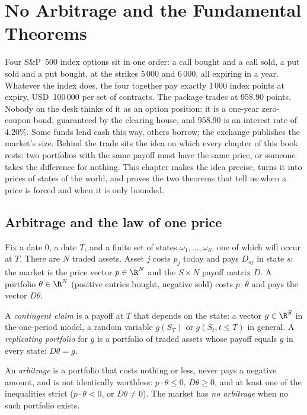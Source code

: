 \chapter{No Arbitrage and the Fundamental Theorems}\label{ch:dv:no-arbitrage-and-the-fundamental-theorems}

Four S\&P~500 index options sit in one order: a call bought and a call sold,
a put sold and a put bought, at the strikes 5\,000 and 6\,000, all expiring in
a year. Whatever the index does, the four together pay exactly 1\,000 index
points at expiry, USD~100\,000 per set of contracts. The package trades at
958.90 points. Nobody on the desk thinks of it as an option position: it is a
one-year zero-coupon bond, guaranteed by the clearing house, and 958.90 is an
interest rate of 4.20\%. Some funds lend cash this way, others borrow; the
exchange publishes the market's size. Behind the trade sits the idea on which
every chapter of this book rests: two portfolios with the same payoff must
have the same price, or someone takes the difference for nothing. This
chapter makes the idea precise, turns it into prices of states of the world,
and proves the two theorems that tell us when a price is forced and when it
is only bounded.

\section{Arbitrage and the law of one price}

Fix a date $0$, a date $T$, and a finite set of states $\omega_1,\dots,\omega_S$,
one of which will occur at $T$. There are $N$ traded assets. Asset $j$ costs
$p_j$ today and pays $D_{sj}$ in state $s$: the market is the price vector
$p\in\R^N$ and the $S\times N$ payoff matrix $D$. A portfolio
$\theta\in\R^N$ (positive entries bought, negative sold) costs $p\cdot\theta$
and pays the vector $D\theta$.

\begin{definition}\label{def:dv:no-arbitrage-and-the-fundamental-theorems:claim}
A \emph{contingent claim} is a payoff at $T$ that
depends on the state: a vector $g\in\R^S$ in the one-period model, a random
variable $g(S_T)$ or $g(S_t, t\le T)$ in general. A \emph{replicating
portfolio} for $g$ is a portfolio of traded assets
whose payoff equals $g$ in every state: $D\theta = g$.
\end{definition}

\begin{definition}[Arbitrage]\label{def:dv:no-arbitrage-and-the-fundamental-theorems:arbitrage}
An \emph{arbitrage} is a portfolio that costs nothing or
less, never pays a negative amount, and is not identically worthless: $p\cdot
\theta\le0$, $D\theta\ge0$, and at least one of the inequalities strict ($p\cdot
\theta<0$, or $D\theta\ne0$). The market has \emph{no arbitrage} when no such
portfolio exists.
\end{definition}

